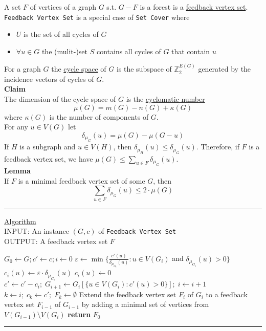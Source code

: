 \documentclass[a4paper, 12pt]{article}
\begin{document}
	A set $F$ of vertices of a graph $G$ s.t. $G-F$ is a forest is a \underline{feedback vertex set}. \texttt{Feedback Vertex Set} is a special case of \texttt{Set Cover} where \begin{itemize}
		\item $U$ is the set of all cycles of $G$
		\item $\forall u \in G$ the (mulit-)set $S$ contains all cycles of $G$ that contain $u$
	\end{itemize}
	For a graph $G$ the \underline{cycle space} of $G$ is the subspace of $\mathbb{Z}_2^{E(G)}$ generated by the incidence vectors of cycles of $G$.\\
	\textbf{Claim}\\
	The dimension of the cycle space of $G$ is the \underline{cyclomatic number} \[\mu(G) = m(G) - n(G) + \kappa(G)\] where $\kappa(G)$ is the number of components of $G$.\\
	
	For any $u \in V(G)$ let \[\delta_{\mu_G} (u) = \mu(G) - \mu(G-u)\]
	If $H$ is a subgraph and $u \in V(H)$, then $\delta_{\mu_H}(u) \leq \delta_{\mu_G}(u)$. Therefore, if $F$ is a feedback vertex set, we have $\mu(G) \leq \sum_{u \in F}\delta_{\mu_G}(u)$.\\
	\textbf{Lemma}\\
	If $F$ is a minimal feedback vertex set of some $G$, then \[\sum_{u \in F} \delta_{\mu_G}(u) \leq 2\cdot \mu(G)\]
	\par\noindent\rule{\textwidth}{0.4pt}
	\underline{Algorithm}\\
	INPUT: An instance $(G,c)$ of \texttt{Feedback Vertex Set}\\
	OUTPUT: A feedback vertex set $F$
	\begin{algorithmic}[1]
		\State $G_0 \gets G; c' \gets c; i \gets 0$
		\State $\varepsilon \gets \min\{\frac{c'(u)}{\delta_{\mu_{G_i}}(u)}: u \in V(G_i)$ and $\delta_{\mu_{G_i}}(u) > 0\}$
		\State $c_i(u) \gets \varepsilon \cdot \delta_{\mu_{G_i}}(u)$
		\Else
		\State $c_i(u) \gets 0$
		\EndIf
	\State $c' \gets c' - c_i;\; G_{i+1} \gets G_i[\{u \in V(G_i): c'(u) > 0\}];\; i \gets i+1$
	\EndWhile
	\State $k \gets i;\; c_k \gets c';\; F_k \gets \emptyset$
	\State Extend the feedback vertex set $F_i$ of $G_i$ to a feedback vertex set $F_{i-1}$ of $G_{i-1}$ by \indent adding a minimal set of vertices from $V(G_{i-1})\setminus V(G_i)$
	\EndFor
	\State \textbf{return} $F_0$
	\end{algorithmic}
	\par\noindent\rule{\textwidth}{0.4pt}\\
	
\end{document}
